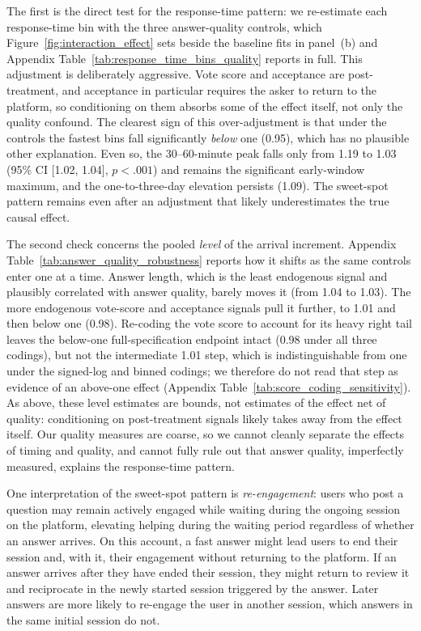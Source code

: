 

The first is the direct test for the response-time pattern: we re-estimate each response-time bin with the three answer-quality controls, which Figure~\ref{fig:interaction_effect} sets beside the baseline fits in panel~(b) and Appendix Table~\ref{tab:response_time_bins_quality} reports in full. This adjustment is deliberately aggressive. Vote score and acceptance are post-treatment, and acceptance in particular requires the asker to return to the platform, so conditioning on them absorbs some of the effect itself, not only the quality confound. The clearest sign of this over-adjustment is that under the controls the fastest bins fall significantly \emph{below} one (0.95), which has no plausible other explanation. Even so, the 30--60-minute peak falls only from 1.19 to 1.03 (95\% CI [1.02, 1.04], $p<.001$) and remains the significant early-window maximum, and the one-to-three-day elevation persists (1.09). The sweet-spot pattern remains even after an adjustment that likely underestimates the true causal effect.

The second check concerns the pooled \emph{level} of the arrival increment. Appendix Table~\ref{tab:answer_quality_robustness} reports how it shifts as the same controls enter one at a time. Answer length, which is the least endogenous signal and plausibly correlated with answer quality, barely moves it (from 1.04 to 1.03). The more endogenous vote-score and acceptance signals pull it further, to 1.01 and then below one (0.98). Re-coding the vote score to account for its heavy right tail leaves the below-one full-specification endpoint intact (0.98 under all three codings), but not the intermediate 1.01 step, which is indistinguishable from one under the signed-log and binned codings; we therefore do not read that step as evidence of an above-one effect (Appendix Table~\ref{tab:score_coding_sensitivity}). As above, these level estimates are bounds, not estimates of the effect net of quality: conditioning on post-treatment signals likely takes away from the effect itself. Our quality measures are coarse, so we cannot cleanly separate the effects of timing and quality, and cannot fully rule out that answer quality, imperfectly measured, explains the response-time pattern.

One interpretation of the sweet-spot pattern is \emph{re-engagement}: users who post a question may remain actively engaged while waiting during the ongoing session on the platform, elevating helping during the waiting period regardless of whether an answer arrives. On this account, a fast answer might lead users to end their session and, with it, their engagement without returning to the platform. If an answer arrives after they have ended their session, they might return to review it and reciprocate in the newly started session triggered by the answer. Later answers are more likely to re-engage the user in another session, which answers in the same initial session do not. 

